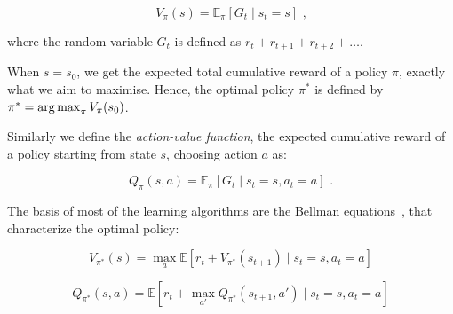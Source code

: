 \begin{equation}\label{eq:statevalueFunction}
V_{\pi}(s)=\mathbb{E}_\pi[G_t \mid s_t = s] \text{ ,}
\end{equation}

where the random variable $G_t$ is defined as $r_{t} +  r_{t+1} + r_{t+2} + \ldots$.

When $s=s_0$, we get the expected total cumulative reward of a policy $\pi$, exactly what we aim to maximise. Hence, the optimal policy $\pi^*$ is defined by $\pi^* = \operatorname*{arg\,max}_{\pi} V_{\pi}(s_0)$.


Similarly we define the \textit{action-value function}, the expected cumulative reward of a policy starting from state $s$, choosing action $a$ as:

\begin{equation}\label{eq:actionvalueFunction}
Q_{\pi}(s, a)=\mathbb{E}_\pi[G_t \mid s_t = s, a_t = a] \text{ .}
\end{equation}


The basis of most of the learning algorithms are the Bellman equations~\cite{bellman1957bellmanequation}, that characterize the optimal policy:


\begin{equation}\label{eq:bellmanState}
V_{\pi^*}(s) = \max_a \mathbb{E} [r_t + V_{\pi^*}(s_{t+1}) \mid s_t=s, a_t=a]
\end{equation}


\begin{equation} \label{eq:bellmanAction}
Q_{\pi^*}(s,a) = \mathbb{E} [r_t + \max_{a'} Q_{\pi^*}(s_{t+1},a') \mid s_t=s, a_t=a ] 
\end{equation}

